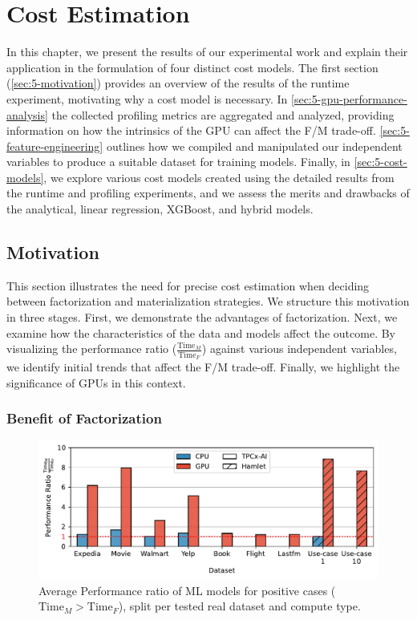 
\chapter{Cost Estimation}

\label{chapter:cost-estimation}
In this chapter, we present the results of our experimental work and explain their application in the formulation of four distinct cost models. The first section (\autoref{sec:5-motivation}) provides an overview of the results of the runtime experiment, motivating why a cost model is necessary. In \autoref{sec:5-gpu-performance-analysis} the collected profiling metrics are aggregated and analyzed, providing information on how the intrinsics of the GPU can affect the F/M trade-off. \autoref{sec:5-feature-engineering} outlines how we compiled and manipulated our independent variables to produce a suitable dataset for training models. Finally, in \autoref{sec:5-cost-models}, we explore various cost models created using the detailed results from the runtime and profiling experiments, and we assess the merits and drawbacks of the analytical, linear regression, XGBoost, and hybrid models.

\section{Motivation}
\label{sec:5-motivation}

This section illustrates the need for precise cost estimation when deciding between factorization and materialization strategies. We structure this motivation in three stages. First, we demonstrate the advantages of factorization. Next, we examine how the characteristics of the data and models affect the outcome. By visualizing the performance ratio ($\frac{\text{Time}_M}{\text{Time}_F}$) against various independent variables, we identify initial trends that affect the F/M trade-off. Finally, we highlight the significance of GPUs in this context.

\subsection{Benefit of Factorization}
\begin{figure}[ht]
  \centering
  \includegraphics[width=0.9\linewidth]{chapters/05_cost_estimation/figures/real_datasets_speedup.pdf}
  \vspace*{-5mm}
  \caption[Performance ratio with factorization on real datasets]{Average Performance ratio of ML models for positive cases ($\text{Time}_M > \text{Time}_F$), split per tested real dataset and compute type. }
  \label{fig:5-real-perf-ratio}
\end{figure}

